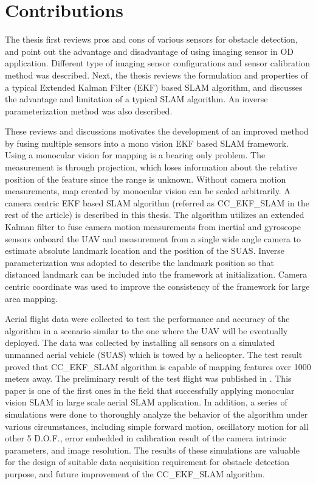 \section{Contributions}\label{section:Contribution}
The thesis first reviews pros and cons of various sensors for obstacle
detection, and point out the advantage and disadvantage of using
imaging sensor in OD application. Different type of imaging sensor
configurations and sensor calibration method was described. Next, the
thesis reviews the formulation and properties of a typical Extended
Kalman Filter (EKF) based SLAM algorithm, and discusses the advantage
and limitation of a typical SLAM algorithm. An inverse
parameterization method was also described.

These reviews and discussions motivates the development of an improved
method by fusing multiple sensors into a mono vision EKF based SLAM
framework. Using a monocular vision for mapping is a bearing only
problem. The measurement is through projection, which loses
information about the relative position of the feature since the range
is unknown. Without camera motion measurements, map created by
monocular vision can be scaled arbitrarily. A camera centric EKF based
SLAM algorithm (referred as CC\_EKF\_SLAM in the rest of the article)
is described in this thesis. The algorithm utilizes an extended Kalman
filter to fuse camera motion measurements from inertial and gyroscope
sensors onboard the UAV and measurement from a single wide angle
camera to estimate absolute landmark location and the position of the
SUAS. Inverse parameterization was adopted to describe the landmark
position so that distanced landmark can be included into the framework
at initialization. Camera centric coordinate was used to improve the
consistency of the framework for large area mapping.

Aerial flight data were collected to test the performance and accuracy
of the algorithm in a scenario similar to the one where the UAV will
be eventually deployed. The data was collected by installing all
sensors on a simulated unmanned aerial vehicle (SUAS) which is towed
by a helicopter. The test result proved that CC\_EKF\_SLAM algorithm
is capable of mapping features over 1000 meters away. The preliminary
result of the test flight was published in \cite{zhang_obstacle_2012}.
This paper is one of the first ones in the field that successfully
applying monocular vision SLAM in large scale aerial SLAM application.
In addition, a series of simulations were done to thoroughly analyze
the behavior of the algorithm under various circumstances, including
simple forward motion, oscillatory motion for all other 5 D.O.F.,
error embedded in calibration result of the camera intrinsic
parameters, and image resolution. The results of these simulations are
valuable for the design of suitable data acquisition requirement for
obstacle detection purpose, and future improvement of the
CC\_EKF\_SLAM algorithm.

